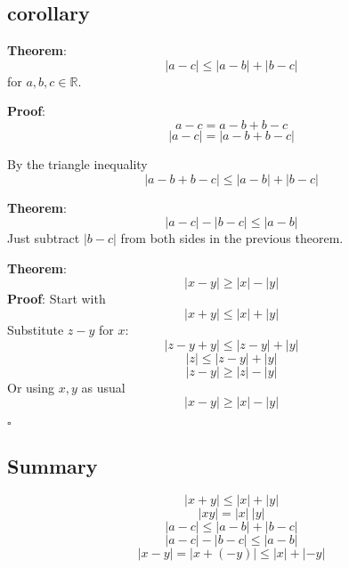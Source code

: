\documentclass[11pt, oneside]{article}
\begin{document}
\subsection*{corollary}

\textbf{Theorem}:
\[ | a - c | \le | a - b | + | b - c | \]
for $a,b,c \in \mathbb{R}$.

\textbf{Proof}:
\[ a - c = a - b + b - c \]
\[ | a - c | = | a - b + b - c | \]

By the triangle inequality
\[ | a - b + b - c | \le | a - b | + | b - c | \]

\textbf{Theorem}:
\[ | a - c | - | b - c | \le | a - b |  \]
Just subtract $| b - c |$ from both sides in the previous theorem.

\textbf{Theorem}:
\[ | x - y | \ge |x| - |y| \]
\textbf{Proof}:
Start with 
\[ |x + y| \le  |x| +  |y| \]
Substitute $z-y$ for $x$:
\[ |z - y + y| \le  |z - y| +  |y| \]
\[ |z| \le  |z - y| +  |y| \]
\[ | z - y | \ge |z| - |y| \]
Or using $x,y$ as usual
\[ |x - y| \ge |x| - |y| \]

$\square$

\subsection*{Summary}
\[ |x + y| \le  |x| +  |y| \]
\[ |xy| = |x| \ |y| \]
\[ | a - c | \le | a - b | + | b - c | \]
\[ | a - c | - | b - c | \le | a - b |  \]
\[ | x - y | = | x + (-y) | \le |x| + |-y|  \]
\end{document}
